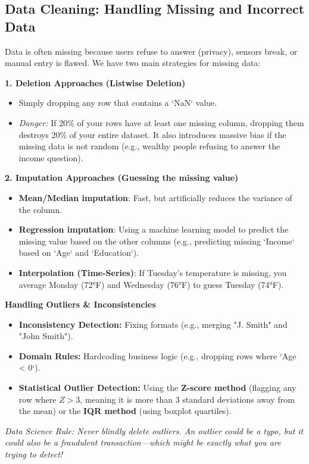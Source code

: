 \subsection{Data Cleaning: Handling Missing and Incorrect Data}

Data is often missing because users refuse to answer (privacy), sensors break, or manual entry is flawed. We have two main strategies for missing data:

\textbf{1. Deletion Approaches (Listwise Deletion)}
\begin{itemize}
    \item Simply dropping any row that contains a `NaN` value. 
    \item \textit{Danger:} If 20\% of your rows have at least one missing column, dropping them destroys 20\% of your entire dataset. It also introduces massive bias if the missing data is not random (e.g., wealthy people refusing to answer the income question).
\end{itemize}

\textbf{2. Imputation Approaches (Guessing the missing value)}
\begin{itemize}
    \item \textbf{Mean/Median imputation}: Fast, but artificially reduces the variance of the column.
    \item \textbf{Regression imputation}: Using a machine learning model to predict the missing value based on the other columns (e.g., predicting missing `Income` based on `Age` and `Education`).
    \item \textbf{Interpolation (Time-Series)}: If Tuesday's temperature is missing, you average Monday (72°F) and Wednesday (76°F) to guess Tuesday (74°F).
\end{itemize}

\textbf{Handling Outliers \& Inconsistencies}
\begin{itemize}
    \item \textbf{Inconsistency Detection:} Fixing formats (e.g., merging "J. Smith" and "John Smith").
    \item \textbf{Domain Rules:} Hardcoding business logic (e.g., dropping rows where `Age < 0`).
    \item \textbf{Statistical Outlier Detection:} Using the \textbf{Z-score method} (flagging any row where $Z > 3$, meaning it is more than 3 standard deviations away from the mean) or the \textbf{IQR method} (using boxplot quartiles).
\end{itemize}

\textit{Data Science Rule: Never blindly delete outliers. An outlier could be a typo, but it could also be a fraudulent transaction—which might be exactly what you are trying to detect!}
